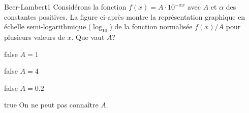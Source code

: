         \begin{question}{27}{Beer-Lambert}{1}{}
            Considérons la fonction $f(x) = A\cdot 10^{-\alpha x}$ avec $A$ et $\alpha$ des constantes positives. La figure ci-après montre la représentation graphique en échelle semi-logarithmique ($\log_{10}$) de la fonction normalisée $f(x)/A$ pour plusieurs valeurs de $x$. Que vaut $A$?
            \begin{figure}
             \end{figure}
        \end{question}
        \begin{reponses}
            \item[false] $A = 1$
		    \item[false] $A = 4$
		    \item[false] $A = \num{0.2}$
		    \item[true] On ne peut pas connaître $A$.
		    \end{reponses}
